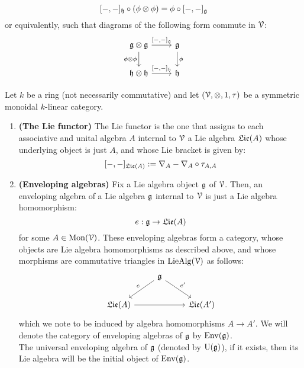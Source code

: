 \begin{definition}
                    $$[-,-]_{\h} \circ (\phi \tensor \phi) = \phi \circ [-,-]_{\g}$$
                or equivalently, such that diagrams of the following form commute in $\mathcal{V}$:
                    $$
                        \begin{tikzcd}
                        	{\g \tensor \g} & {\g} \\
                        	{\h \tensor \h} & {\h}
                        	\arrow["{\phi}", from=1-2, to=2-2]
                        	\arrow["{\phi \tensor \phi}"', from=1-1, to=2-1]
                        	\arrow["{[-,-]_{\h}}", from=2-1, to=2-2]
                        	\arrow["{[-,-]_{\g}}", from=1-1, to=1-2]
                        \end{tikzcd}
                    $$
            \end{definition}
            
            \begin{definition} \label{def: enveloping_algebras}
                Let $k$ be a ring (not necessarily commutative) and let $(\calV, \tensor, 1, \tau)$ be a symmetric monoidal $k$-linear category.
                    \begin{enumerate}
                        \item \textbf{(The Lie functor)} The Lie functor is the one that assigns to each associative and unital algebra $A$ internal to $\mathcal{V}$ a Lie algebra $\mathfrak{Lie}(A)$ whose underlying object is just $A$, and whose Lie bracket is given by:
                            $$[-,-]_{\mathfrak{Lie}(A)} := \nabla_A - \nabla_A \circ \tau_{A,A}$$
                        \item \textbf{(Enveloping algebras)} Fix a Lie algebra object $\mathfrak{g}$ of $\mathcal{V}$. Then, an enveloping algebra of a Lie algebra $\mathfrak{g}$ internal to $\mathcal{V}$ is just a Lie algebra homomorphism:
                            $$e: \mathfrak{g} \to \mathfrak{Lie}(A)$$
                        for some $A \in \mathrm{Mon}(\mathcal{V})$. These enveloping algebras form a category, whose objects are Lie algebra homomorphisms as described above, and whose morphisms are commutative triangles in $\mathrm{Lie}\mathrm{Alg}(\mathcal{V})$ as follows:
                            $$
                                \begin{tikzcd}
                                	& {\g} \\
                                	{\frakLie(A)} && {\frakLie(A')}
                                	\arrow[from=2-1, to=2-3]
                                	\arrow["{e}"', from=1-2, to=2-1]
                                	\arrow["{e'}", from=1-2, to=2-3]
                                \end{tikzcd}
                            $$
                        which we note to be induced by algebra homomorphisms $A \to A'$. We will denote the category of enveloping algebras of $\mathfrak{g}$ by $\mathrm{Env}(\mathfrak{g})$. 
                        \\
                        The universal enveloping algebra of $\mathfrak{g}$ (denoted by $\mathrm{U}(\mathfrak{g})$), if it exists, then its Lie algebra will be the initial object of $\mathrm{Env}(\mathfrak{g})$. 
                    \end{enumerate}
            \end{definition}
            
